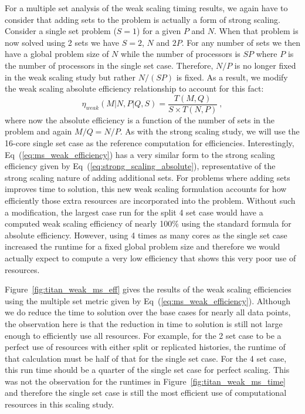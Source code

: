 For a multiple set analysis of the weak scaling timing results, we
again have to consider that adding sets to the problem is actually a
form of strong scaling. Consider a single set problem ($S=1$) for a
given $P$ and $N$. When that problem is now solved using 2 sets we
have $S=2$, $N$ and $2P$. For any number of sets we then have a global
problem size of $N$ while the number of processors is $SP$ where $P$
is the number of processors in the single set case. Therefore, $N/P$
is no longer fixed in the weak scaling study but rather $N/(SP)$ is
fixed. As a result, we modify the weak scaling absolute efficiency
relationship to account for this fact:
\begin{equation}
\eta_{weak}(M|N,P|Q,S) = \frac{T(M,Q)}{S \times T(N,P)}\:,
  \label{eq:ms_weak_efficiency}
\end{equation}
where now the absolute efficiency is a function of the number of sets
in the problem and again $M/Q = N/P$. As with the strong scaling
study, we will use the 16-core single set case as the reference
computation for efficiencies. Interestingly,
Eq~(\ref{eq:ms_weak_efficiency}) has a very similar form to the strong
scaling efficiency given by Eq~(\ref{eq:strong_scaling_absolute}),
representative of the strong scaling nature of adding additional
sets. For problems where adding sets improves time to solution, this
new weak scaling formulation accounts for how efficiently those extra
resources are incorporated into the problem. Without such a
modification, the largest case run for the split 4 set case would have
a computed weak scaling efficiency of nearly 100\% using the standard
formula for absolute efficiency. However, using 4 times as many cores
as the single set case increased the runtime for a fixed global
problem size and therefore we would actually expect to compute a very
low efficiency that shows this very poor use of resources.

Figure~\ref{fig:titan_weak_ms_eff} gives the results of the weak
scaling efficiencies using the multiple set metric given by
Eq~(\ref{eq:ms_weak_efficiency}). Although we do reduce the time to
solution over the base cases for nearly all data points, the
observation here is that the reduction in time to solution is still
not large enough to efficiently use all resources. For example, for
the 2 set case to be a perfect use of resources with either split or
replicated histories, the runtime of that calculation must be half of
that for the single set case. For the 4 set case, this run time should
be a quarter of the single set case for perfect scaling. This was not
the observation for the runtimes in
Figure~\ref{fig:titan_weak_ms_time} and therefore the single set case
is still the most efficient use of computational resources in this
scaling study.


